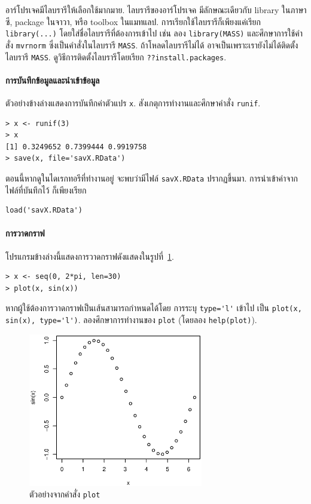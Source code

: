 อาร์โปรเจคมีไลบรารีให้เลือกใช้มากมาย.
ไลบรารีของอาร์โปรเจค มีลักษณะเดียวกับ library ในภาษาซี, package ในจาวา, หรือ toolbox ในแมทแลป. การเรียกใช้ไลบรารีก็เพียงแค่เรียก \verb|library(...)| โดยใส่ชื่อไลบรารีที่ต้องการเข้าไป 
เช่น
ลอง \verb|library(MASS)| และศึกษาการใช้คำสั่ง \verb|mvrnorm| ซึ่งเป็นคำสั่งในไลบรารี \verb|MASS|.
ถ้าโหลดไลบรารีไม่ได้ อาจเป็นเพราะเรายังไม่ได้ติดตั้ง ไลบรารี \verb|MASS|.
ดูวิธีการติดตั้งไลบรารีโดยเรียก \verb|??install.packages|.

\paragraph{การบันทึกข้อมูลและนำเข้าข้อมูล}
ตัวอย่างข้างล่างแสดงการบันทึกค่าตัวแปร \verb|x|.
สังเกตุการทำงานและศึกษาคำสั่ง \verb|runif|.
\begin{verbatim}
> x <- runif(3)
> x
[1] 0.3249652 0.7399444 0.9919758
> save(x, file='savX.RData')
\end{verbatim}
ตอนนี้หากดูในไดเรกทอรีที่ทำงานอยู่ จะพบว่ามีไฟล์ \texttt{savX.RData} ปรากฏขึ้นมา.
การนำเข้าค่าจากไฟล์ที่บันทึกไว้ ก็เพียงเรียก
\begin{verbatim}
load('savX.RData')
\end{verbatim}

\paragraph{การวาดกราฟ}
โปรแกรมข้างล่างนี้แสดงการวาดกราฟดังแสดงในรูปที่~\ref{fig: R plot}.
\begin{verbatim}
> x <- seq(0, 2*pi, len=30)
> plot(x, sin(x))
\end{verbatim}

หากผู้ใช้ต้องการวาดกราฟเป็นเส้นสามารถกำหนดได้โดย การระบุ \verb|type='l'| เข้าไป เป็น \verb|plot(x, sin(x), type='l')|.
ลองศึกษาการทำงานของ \verb|plot| (โดยลอง \verb|help(plot)|).

%
\begin{figure}
\begin{center}
\includegraphics[width=3.0in]
{01Intro/Rplot01.eps}
\end{center}
\caption{ตัวอย่างจากคำสั่ง \texttt{plot}}
\label{fig: R plot}
\end{figure}
%

